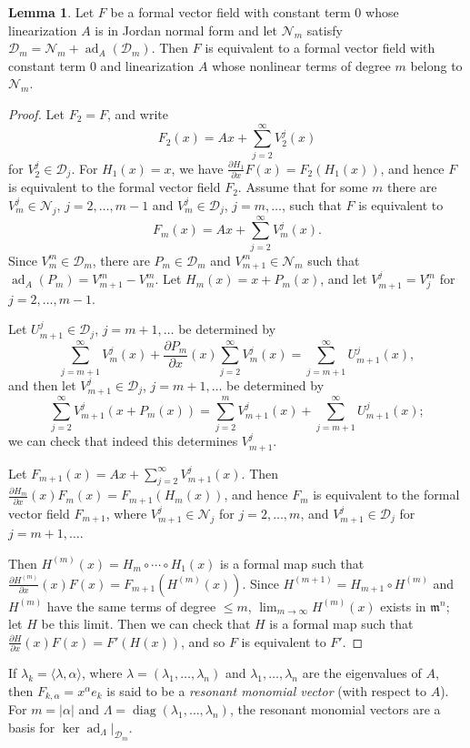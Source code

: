 \documentclass{article}
\theoremstyle{definition}
\newtheorem{lemma}[theorem]{Lemma}
\newcommand{\diag}{\operatorname{diag}}
\newcommand{\ad}{\operatorname{ad}}
\begin{document}
\begin{lemma}
\label{paradigm}
Let $F$ be a formal vector field with constant term $0$ whose linearization $A$ is in Jordan normal form
and let $\mathscr{N}_m$ satisfy 
$\mathscr{D}_m=\mathscr{N}_m + \ad_A(\mathscr{D}_m)$. Then $F$ is equivalent to a formal vector
field with constant term $0$ and linearization $A$ whose  nonlinear terms of degree $m$ belong to $\mathscr{N}_m$.
\end{lemma}
\begin{proof}
Let $F_2=F$, and write
\[
F_2(x)=Ax+\sum_{j=2}^\infty V^j_2(x)
\]
for $V^j_2 \in \mathscr{D}_j$. For $H_1(x)=x$, we have $\frac{\partial H_1}{\partial x}F(x)=
F_2(H_1(x))$, and hence $F$ is equivalent to the formal vector field $F_2$. Assume that for some $m$ there are $V^j_m \in \mathscr{N}_j$, $j=2,
\dots,m-1$ and $V^j_m \in \mathscr{D}_j$, $j=m,\ldots$, such that $F$ is equivalent to
\[
F_m(x)=Ax+\sum_{j=2}^\infty V^j_m(x).
\]
Since $V_m^m \in \mathscr{D}_m$, there are $P_m \in \mathscr{D}_m$ and $V^m_{m+1} \in
\mathscr{N}_m$ such that $\ad_A(P_m)=V^m_{m+1}-V_m^m$. Let $H_m(x)=x+P_m(x)$, and let
$V^j_{m+1}=V_j^m$ for $j=2,\ldots,m-1$.

Let $U^j_{m+1} \in \mathscr{D}_j$, $j=m+1,\ldots$ be determined by
\[
\sum_{j=m+1}^\infty V^j_m(x) + \frac{\partial P_m}{\partial x}(x)\sum_{j=2}^\infty V^j_m(x)
=\sum_{j=m+1}^\infty U^j_{m+1}(x),
\]
and then let $V^j_{m+1} \in \mathscr{D}_j$, $j=m+1,\ldots$ be determined by
\[
\sum_{j=2}^\infty V^j_{m+1}(x+P_m(x))=\sum_{j=2}^m V^j_{m+1}(x)
+ \sum_{j=m+1}^\infty U^j_{m+1}(x);
\]
we can check that indeed this determines $V^j_{m+1}$.

Let $F_{m+1}(x)=Ax+\sum_{j=2}^\infty V^j_{m+1}(x)$. Then
$\frac{\partial H_m}{\partial x}(x)F_m(x)=F_{m+1}(H_m(x))$, and hence $F_m$ is equivalent to the formal vector field $F_{m+1}$, where $V^j_{m+1} \in \mathscr{N}_j$ for $j=2,\ldots,m$, and $V^j_{m+1} \in \mathscr{D}_j$
for $j=m+1,\ldots$. 

Then 
$H^{(m)}(x)=H_m \circ \cdots \circ H_1(x)$ is a formal map such that
$\frac{\partial H^{(m)}}{\partial x}(x) F(x)=F_{m+1}(H^{(m)}(x))$.
Since $H^{(m+1)}=H_{m+1} \circ H^{(m)}$ and $H^{(m)}$ have the same terms of
degree $\leq m$,  $\lim_{m \to \infty} H^{(m)}(x)$ exists in $\mathfrak{m}^n$; let $H$ be this limit. Then
we can check that $H$ is a formal map such that 
$\frac{\partial H}{\partial x}(x) F(x)=F'(H(x))$, and so
$F$ is equivalent to $F'$.
\end{proof}

If $\lambda_k=\langle \lambda,\alpha \rangle$, where $\lambda=(\lambda_1,\ldots,\lambda_n)$ and $\lambda_1,\ldots,\lambda_n$ are the eigenvalues of $A$, then
 $F_{k,\alpha}=x^\alpha e_k$ is said to be a {\em resonant monomial vector} (with respect to $A$). For $m=|\alpha|$
 and $\Lambda=\diag(\lambda_1,\ldots,\lambda_n)$, the resonant monomial vectors are a basis for $\ker \ad_\Lambda|_{\mathscr{D}_m}$.
 
\end{document}
